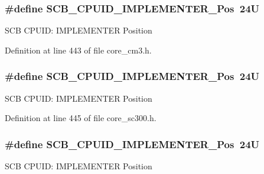 \subsubsection[{\texorpdfstring{S\+C\+B\+\_\+\+C\+P\+U\+I\+D\+\_\+\+I\+M\+P\+L\+E\+M\+E\+N\+T\+E\+R\+\_\+\+Pos}{SCB_CPUID_IMPLEMENTER_Pos}}]{\setlength{\rightskip}{0pt plus 5cm}\#define S\+C\+B\+\_\+\+C\+P\+U\+I\+D\+\_\+\+I\+M\+P\+L\+E\+M\+E\+N\+T\+E\+R\+\_\+\+Pos~24U}\hypertarget{group___c_m_s_i_s___s_c_b_ga58686b88f94f789d4e6f429fe1ff58cf}{}\label{group___c_m_s_i_s___s_c_b_ga58686b88f94f789d4e6f429fe1ff58cf}
S\+CB C\+P\+U\+ID\+: I\+M\+P\+L\+E\+M\+E\+N\+T\+ER Position 

Definition at line 443 of file core\+\_\+cm3.\+h.

\subsubsection[{\texorpdfstring{S\+C\+B\+\_\+\+C\+P\+U\+I\+D\+\_\+\+I\+M\+P\+L\+E\+M\+E\+N\+T\+E\+R\+\_\+\+Pos}{SCB_CPUID_IMPLEMENTER_Pos}}]{\setlength{\rightskip}{0pt plus 5cm}\#define S\+C\+B\+\_\+\+C\+P\+U\+I\+D\+\_\+\+I\+M\+P\+L\+E\+M\+E\+N\+T\+E\+R\+\_\+\+Pos~24U}\hypertarget{group___c_m_s_i_s___s_c_b_ga58686b88f94f789d4e6f429fe1ff58cf}{}\label{group___c_m_s_i_s___s_c_b_ga58686b88f94f789d4e6f429fe1ff58cf}
S\+CB C\+P\+U\+ID\+: I\+M\+P\+L\+E\+M\+E\+N\+T\+ER Position 

Definition at line 445 of file core\+\_\+sc300.\+h.

\subsubsection[{\texorpdfstring{S\+C\+B\+\_\+\+C\+P\+U\+I\+D\+\_\+\+I\+M\+P\+L\+E\+M\+E\+N\+T\+E\+R\+\_\+\+Pos}{SCB_CPUID_IMPLEMENTER_Pos}}]{\setlength{\rightskip}{0pt plus 5cm}\#define S\+C\+B\+\_\+\+C\+P\+U\+I\+D\+\_\+\+I\+M\+P\+L\+E\+M\+E\+N\+T\+E\+R\+\_\+\+Pos~24U}\hypertarget{group___c_m_s_i_s___s_c_b_ga58686b88f94f789d4e6f429fe1ff58cf}{}\label{group___c_m_s_i_s___s_c_b_ga58686b88f94f789d4e6f429fe1ff58cf}
S\+CB C\+P\+U\+ID\+: I\+M\+P\+L\+E\+M\+E\+N\+T\+ER Position 

